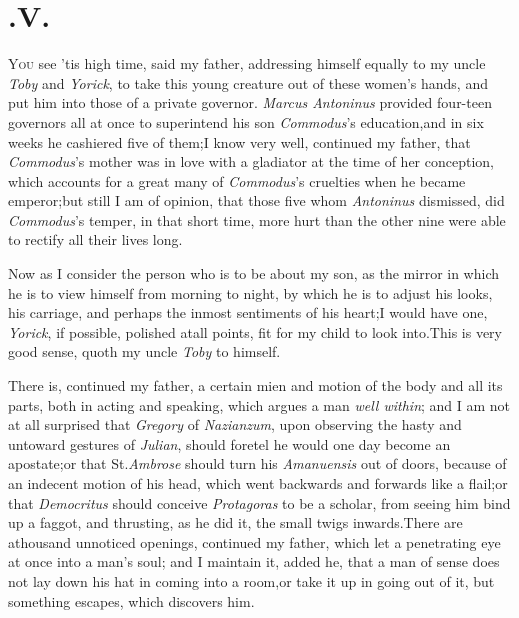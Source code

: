 \documentclass{article}
\begin{document}
\vskip -6pt
\enlargethispage\baselineskip

\section{.\enspace V.}

\lettrine{Y}{ou} see ’tis high time, said my
father, addressing himself equally to my uncle \textit{Toby} and
\textit{Yorick}, to take this young creature out of these
women’s hands, and put him into those of a private governor.
\textit{Marcus Antoninus} provided four-\pb teen governors all at once to
superintend his son \textit{Commodus}’s education,\tsk and in
six weeks he cashiered five of them;\tsk \break I know very well,
continued my father, that \textit{Commodus}’s mother was in
love with a gladiator at the time of her conception, which accounts
for a great many of \textit{Commodus}’s cruelties when he
became emperor;\tsk but still I am of opinion, that those five
whom \textit{Antoninus} dismissed, did \textit{Commodus}’s
temper, in that short time, more hurt than the other nine were able
to rectify all their lives long.

Now as I consider the person who is to be about my son, as the
mirror in which he is to view himself from morning to night,
by which he is to adjust his looks, his carriage, and perhaps the
inmost sentiments of his heart;\tsk I would have one,
\textit{Yorick}, if possible, polished at\pb all points, fit for my
child to look into.\break\tsh This is very good sense, quoth my
uncle \textit{Toby} to himself.

\tsh There is, continued my father, a certain mien and
motion of the body and all its parts, both in acting and speaking,
which argues a man \textit{well within}; and I am not at all
surprised that \textit{Gregory} of \textit{Nazianzum}, upon observing
the hasty and untoward gestures of \textit{Julian}, should foretel he
would one day become an apostate;\tsh or that St.\@ \textit{Ambrose} should turn his \textit{Amanuensis} out of doors,
because of an indecent motion of his head, which went backwards and
forwards like a flail;\tsh or that \textit{Democritus}
should conceive \textit{Protagoras} to be a scholar, from seeing him
bind up a faggot, and thrusting, as he did it, the small twigs
inwards.\tsh There are a\pb thousand unnoticed openings,
continued my father, which let a penetrating eye at once into
a man’s soul; and I maintain it, added he, that a man of
sense does not lay down his hat in coming into a room,\tsk or
take it up in going out of it, but something escapes, which
discovers him.
\end{document}

